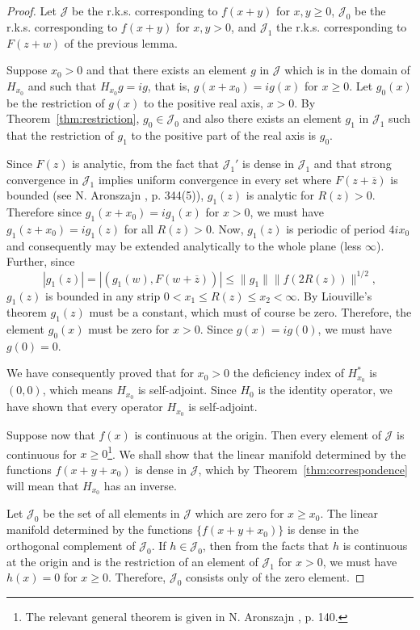 \documentclass{article}
\begin{document}
\begin{proof}
Let $\mathcal{J}$ be the r.k.s. corresponding to $f(x+y)$ for $x, y \geq 0$, $\mathcal{J}_0$ be the r.k.s. corresponding to $f(x+y)$ for $x, y > 0$, and $\mathcal{J}_1$ the r.k.s. corresponding to $F(z+w)$ of the previous lemma.

Suppose $x_0 > 0$ and that there exists an element $g$ in $\mathcal{J}$ which is in the domain of $H_{x_0}$ and such that $H_{x_0}g = ig$, that is, $g(x+x_0) = ig(x)$ for $x \geq 0$. Let $g_0(x)$ be the restriction of $g(x)$ to the positive real axis, $x > 0$. By Theorem~\ref{thm:restriction}, $g_0 \in \mathcal{J}_0$ and also there exists an element $g_1$ in $\mathcal{J}_1$ such that the restriction of $g_1$ to the positive part of the real axis is $g_0$.

Since $F(z)$ is analytic, from the fact that $\mathcal{J}_1'$ is dense in $\mathcal{J}_1$ and that strong convergence in $\mathcal{J}_1$ implies uniform convergence in every set where $F(z+\overline{z})$ is bounded (see N. Aronszajn \cite{aronszajn2}, p. 344(5)), $g_1(z)$ is analytic for $R(z) > 0$. Therefore since $g_1(x+x_0) = ig_1(x)$ for $x > 0$, we must have $g_1(z+x_0) = ig_1(z)$ for all $R(z) > 0$. Now, $g_1(z)$ is periodic of period $4ix_0$ and consequently may be extended analytically to the whole plane (less $\infty$). Further, since
\begin{equation}
|g_1(z)| = |(g_1(w), F(w + \overline{z}))| \leq \|g_1\| \|f(2R(z))\|^{1/2},
\label{eq:bound-estimate}
\end{equation}
$g_1(z)$ is bounded in any strip $0 < x_1 \leq R(z) \leq x_2 < \infty$. By Liouville's theorem $g_1(z)$ must be a constant, which must of course be zero. Therefore, the element $g_0(x)$ must be zero for $x > 0$. Since $g(x) = ig(0)$, we must have $g(0) = 0$.

We have consequently proved that for $x_0 > 0$ the deficiency index of $H_{x_0}^*$ is $(0, 0)$, which means $H_{x_0}$ is self-adjoint. Since $H_0$ is the identity operator, we have shown that every operator $H_{x_0}$ is self-adjoint.

Suppose now that $f(x)$ is continuous at the origin. Then every element of $\mathcal{J}$ is continuous for $x \geq 0$\footnote{The relevant general theorem is given in N. Aronszajn \cite{aronszajn1}, p. 140.}. We shall show that the linear manifold determined by the functions $f(x+y+x_0)$ is dense in $\mathcal{J}$, which by Theorem~\ref{thm:correspondence} will mean that $H_{x_0}$ has an inverse.

Let $\mathcal{J}_0$ be the set of all elements in $\mathcal{J}$ which are zero for $x \geq x_0$. The linear manifold determined by the functions $\{f(x+y+x_0)\}$ is dense in the orthogonal complement of $\mathcal{J}_0$. If $h \in \mathcal{J}_0$, then from the facts that $h$ is continuous at the origin and is the restriction of an element of $\mathcal{J}_1$ for $x > 0$, we must have $h(x) = 0$ for $x \geq 0$. Therefore, $\mathcal{J}_0$ consists only of the zero element.
\end{proof}
\end{document}
